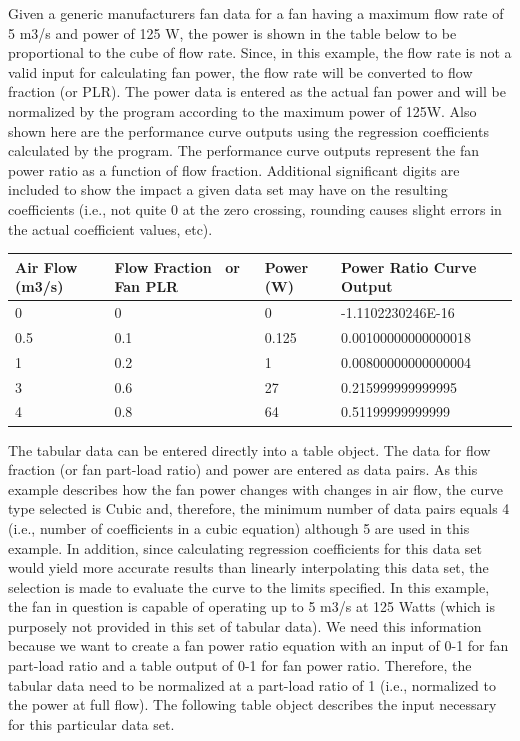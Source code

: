 Given a generic manufacturers fan data for a fan having a maximum flow rate of 5 m3/s and power of 125 W, the power is shown in the table below to be proportional to the cube of flow rate. Since, in this example, the flow rate is not a valid input for calculating fan power, the flow rate will be converted to flow fraction (or PLR). The power data is entered as the actual fan power and will be normalized by the program according to the maximum power of 125W. Also shown here are the performance curve outputs using the regression coefficients calculated by the program. The performance curve outputs represent the fan power ratio as a function of flow fraction. Additional significant digits are included to show the impact a given data set may have on the resulting coefficients (i.e., not quite 0 at the zero crossing, rounding causes slight errors in the actual coefficient values, etc).

\begin{longtable}[c]{p{1.5in}p{1.5in}p{1.5in}p{1.5in}}
\toprule 
Air Flow (m3/s) & Flow Fraction~ or Fan PLR & Power (W) & Power Ratio Curve Output \tabularnewline \midrule
\endhead
0 & 0 & 0 & -1.1102230246E-16 \tabularnewline
0.5 & 0.1 & 0.125 & 0.00100000000000018 \tabularnewline
1 & 0.2 & 1 & 0.00800000000000004 \tabularnewline
3 & 0.6 & 27 & 0.215999999999995 \tabularnewline
4 & 0.8 & 64 & 0.51199999999999 \tabularnewline
\bottomrule
\end{longtable}

The tabular data can be entered directly into a table object. The data for flow fraction (or fan part-load ratio) and power are entered as data pairs. As this example describes how the fan power changes with changes in air flow, the curve type selected is Cubic and, therefore, the minimum number of data pairs equals 4 (i.e., number of coefficients in a cubic equation) although 5 are used in this example. In addition, since calculating regression coefficients for this data set would yield more accurate results than linearly interpolating this data set, the selection is made to evaluate the curve to the limits specified. In this example, the fan in question is capable of operating up to 5 m3/s at 125 Watts (which is purposely not provided in this set of tabular data). We need this information because we want to create a fan power ratio equation with an input of 0-1 for fan part-load ratio and a table output of 0-1 for fan power ratio. Therefore, the tabular data need to be normalized at a part-load ratio of 1 (i.e., normalized to the power at full flow). The following table object describes the input necessary for this particular data set.

